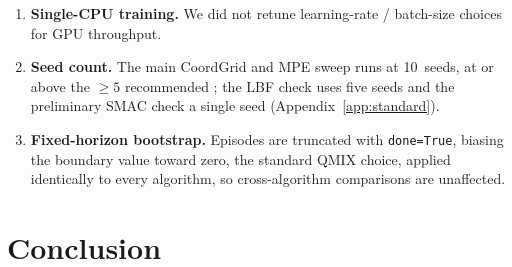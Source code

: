 \documentclass[manuscript, screen, review]{jair}
\providecommand{\citep}{\parencite}
\newcommand{\PEseeds}{10}             %
\begin{document}
\begin{enumerate}[leftmargin=*,itemsep=0pt,topsep=2pt]
        an exactly-correct graph against a fully-wrong matching and all-to-all,
        but not the intermediate case a practitioner faces---a graph with a
        \emph{fraction} of its partner edges correct. We therefore cannot say
        whether the benefit degrades gracefully or cliffs as the graph drifts
        from correct; a partial-correctness sweep (edges correct in
        $\{0,0.25,0.5,0.75,1\}$) would turn the binary right-vs-wrong contrast
        into a graded mis-specification-cost curve and is the cheapest
        decision-relevant extension.
  \item \textbf{Single-CPU training.} We did not retune learning-rate /
        batch-size choices for GPU throughput.
  \item \textbf{Seed count.} The main CoordGrid and MPE sweep runs at
        \PEseeds\ seeds, at or above the $\ge 5$ recommended
        \citep{henderson_2018_drlmatters,agarwal_2021_precipice}; the LBF
        check uses five seeds and the preliminary SMAC check a single seed
        (Appendix~\ref{app:standard}).
  \item \textbf{Fixed-horizon bootstrap.} Episodes are truncated with
        \texttt{done=True}, biasing the boundary value toward zero, the
        standard QMIX choice, applied identically to every algorithm, so
        cross-algorithm comparisons are unaffected.
\end{enumerate}

\section{Conclusion}
\label{sec:conclusion}
\end{document}
